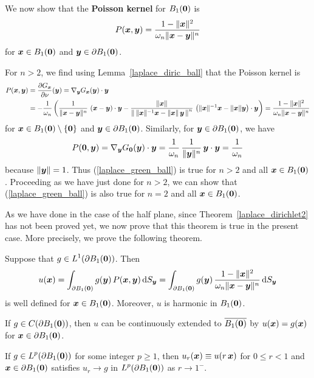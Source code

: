 We now show that the {\bfseries Poisson kernel}
for $B_1({\bm{0}})$ is
\begin{equation} \label{laplace_green_ball}
P({\bm{x}},{\bm{y}}) =
\frac{1-\|{\bm{x}}\|^2}{\omega_n \|{\bm{x}}-{\bm{y}}\|^n}
\end{equation}
for ${\bm{x}}\in B_1({\bm{0}})$ and ${\bm{y}} \in \partial B_1({\bm{0}})$.

For $n>2$, we find using Lemma~\ref{laplace_diric_ball} that the
Poisson kernel is
\begin{align*}
P({\bm{x}},{\bm{y}}) &= \frac{\partial{G_{{\bm{x}}}}}{\partial \nu}({\bm{y}}) =
\nabla_{{\bm{y}}} G_{{\bm{x}}}({\bm{y}}) \cdot {\bm{y}} \\
&= - \frac{1}{\omega_n} \left( \frac{1}{\| {\bm{x}} - {\bm{y}}\|^{n}}
\, \left({\bm{x}}-{\bm{y}}\right) \cdot {\bm{y}} -
\frac{\|{\bm{x}}\|}
{\left\| \, \|{\bm{x}}\|^{-1}{\bm{x}} - \|{\bm{x}}\|\,{\bm{y}}\, \right\|^{n}}
\, \left( \|{\bm{x}}\|^{-1}{\bm{x}} - \|{\bm{x}}\|{\bm{y}}
\right) \cdot {\bm{y}} \right)
= \frac{1-\|{\bm{x}}\|^2}{\omega_n \|{\bm{x}}-{\bm{y}}\|^n}
\end{align*}
for ${\bm{x}} \in B_1({\bm{0}})\setminus \{{\bm{0}}\}$ and
${\bm{y}} \in \partial B_1({\bm{0}})$.  Similarly, for
${\bm{y}} \in \partial B_1({\bm{0}})$, we have
\[
P({\bm{0}},{\bm{y}}) = \nabla_{{\bm{y}}} G_{{\bm{0}}}({\bm{y}}) \cdot {\bm{y}}
= \frac{1}{\omega_n} \, \frac{1}{\|{\bm{y}}\|^{n}}
\, {\bm{y}} \cdot {\bm{y}} = \frac{1}{\omega_n}
\]
because $\|{\bm{y}}\|=1$.
Thus (\ref{laplace_green_ball}) is true for $n>2$ and all
${\bm{x}} \in B_1({\bm{0}})$.  Proceeding as we have just done for
$n>2$, we can show that (\ref{laplace_green_ball}) is also true for
$n=2$ and all ${\bm{x}} \in B_1({\bm{0}})$.

As we have done in the case of the half plane, since
Theorem~\ref{laplace_dirichlet2} has not been proved yet, we now prove
that this theorem is true in the present case.  More precisely, we
prove the following theorem.

\begin{theorem} \label{laplace_exist_ball}
Suppose that $\displaystyle g \in L^1(\partial B_1({\bm{0}}))$.  Then
\[
u({\bm{x}}) = \int_{\partial B_1({\bm{0}})} g({\bm{y}}) \,
P({\bm{x}},{\bm{y}}) \,\mathrm{d}{S}_{{\bm{y}}}
= \int_{\partial B_1({\bm{0}})} g({\bm{y}}) \,
\frac{1-\|{\bm{x}}\|^2}{\omega_n \|{\bm{x}}-{\bm{y}}\|^n} \,\mathrm{d}{S}_{{\bm{y}}}
\]
is well defined for ${\bm{x}} \in B_1({\bm{0}})$.
Moreover, $u$ is harmonic in $B_1({\bm{0}})$.

If $g\in C(\partial B_1({\bm{0}}))$, then $u$ can be
continuously extended to $\overline{B_1({\bm{0}})}$ by
$u({\bm{x}}) = g({\bm{x}})$ for ${\bm{x}} \in \partial B_1({\bm{0}})$.

If $\displaystyle g \in L^p(\partial B_1({\bm{0}}))$ for some integer
$p \geq 1$, then $u_r({\bm{x}}) \equiv u(r\,{\bm{x}})$ for $0\leq r < 1$ and
${\bm{x}} \in \partial B_1({\bm{0}})$ satisfies $u_r \rightarrow g$ in
$\displaystyle L^p(\partial B_1({\bm{0}}))$ as $r \rightarrow 1^-$.
\end{theorem}

